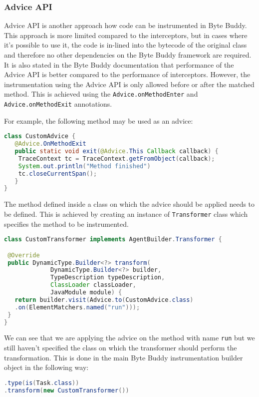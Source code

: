 \subsubsection{Advice API}
Advice API is another approach how code can be instrumented in Byte Buddy. This approach is more limited compared to the interceptors, but in cases where it's possible to use it, the code is in-lined into the bytecode of the original class and therefore no other dependencies on the Byte Buddy framework are required. It is also stated in the Byte Buddy documentation that performance of the Advice API is better compared to the performance of interceptors.
However, the instrumentation using the Advice API is only allowed before or after the matched method. This is achieved using the \texttt{Advice.onMethodEnter} and \texttt{Advice.onMethodExit} annotations. 

For example, the following method may be used as an advice: 
\begin{lstlisting}[language=Java]
class CustomAdvice {
   @Advice.OnMethodExit
   public static void exit(@Advice.This Callback callback) {
   	TraceContext tc = TraceContext.getFromObject(callback);
   	System.out.println("Method finished")
   	tc.closeCurrentSpan();
   }
}   
\end{lstlisting}

The method defined inside a class on which the advice should be applied needs to be defined. This is achieved by creating an instance of \texttt{Transformer} class which specifies the method to be instrumented.

\begin{lstlisting}[language=Java]
class CustomTransformer implements AgentBuilder.Transformer {

 @Override
 public DynamicType.Builder<?> transform(
			 DynamicType.Builder<?> builder,
			 TypeDescription typeDescription,
			 ClassLoader classLoader,
			 JavaModule module) {
   return builder.visit(Advice.to(CustomAdvice.class)
   .on(ElementMatchers.named("run")));
 }
}
\end{lstlisting}
We can see that we are applying the advice on the method with name \texttt{run} but we still haven't specified the class on which the transformer should perform the transformation. This is done in the main Byte Buddy instrumentation builder object in the following way:

\begin{lstlisting}[language=Java]
.type(is(Task.class))
.transform(new CustomTransformer())
\end{lstlisting}

